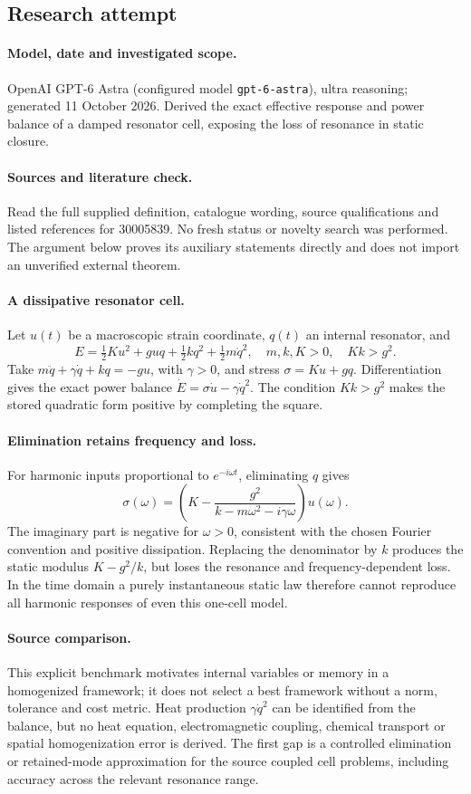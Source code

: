\documentclass[11pt]{article}
\begin{document}
\subsection{Research attempt}
\paragraph{Model, date and investigated scope.}
OpenAI GPT-6 Astra (configured model \texttt{gpt-6-astra}), ultra reasoning; generated 11 October 2026. Derived the exact effective response and power balance of a damped resonator cell, exposing the loss of resonance in static closure.

\paragraph{Sources and literature check.}
Read the full supplied definition, catalogue wording, source qualifications and listed references for 30005839. No fresh status or novelty search was performed. The argument below proves its auxiliary statements directly and does not import an unverified external theorem.

\paragraph{A dissipative resonator cell.} Let \(u(t)\) be a macroscopic strain coordinate, \(q(t)\) an internal resonator, and
\[
 E=\tfrac12K u^2+g u q+\tfrac12kq^2+\tfrac12m\dot q^2,
 \quad m,k,K>0,\quad Kk>g^2.
\]
Take \(m\ddot q+\gamma\dot q+kq=-gu\), with \(\gamma>0\), and stress \(\sigma=Ku+gq\). Differentiation gives the exact power balance \(\dot E=\sigma\dot u-\gamma\dot q^2\). The condition \(Kk>g^2\) makes the stored quadratic form positive by completing the square.
\paragraph{Elimination retains frequency and loss.} For harmonic inputs proportional to \(e^{-i\omega t}\), eliminating \(q\) gives
\[
 \sigma(\omega)=\left(K-\frac{g^2}{k-m\omega^2-i\gamma\omega}\right)u(\omega).
\]
The imaginary part is negative for \(\omega>0\), consistent with the chosen Fourier convention and positive dissipation. Replacing the denominator by \(k\) produces the static modulus \(K-g^2/k\), but loses the resonance and frequency-dependent loss. In the time domain a purely instantaneous static law therefore cannot reproduce all harmonic responses of even this one-cell model.
\paragraph{Source comparison.} This explicit benchmark motivates internal variables or memory in a homogenized framework; it does not select a best framework without a norm, tolerance and cost metric. Heat production \(\gamma\dot q^2\) can be identified from the balance, but no heat equation, electromagnetic coupling, chemical transport or spatial homogenization error is derived. The first gap is a controlled elimination or retained-mode approximation for the source coupled cell problems, including accuracy across the relevant resonance range.
\end{document}
